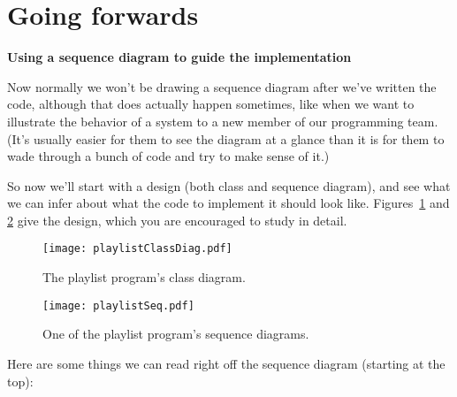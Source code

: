 \section{Going forwards}

\vspace{-.2in}
{\large \textbf{Using a sequence diagram to guide the implementation}}

Now normally we won't be drawing a sequence diagram after we've written the
code, although that does actually happen sometimes, like when we want to
illustrate the behavior of a system to a new member of our programming team.
(It's usually easier for them to see the diagram at a glance than it is for
them to wade through a bunch of code and try to make sense of it.)

So now we'll start with a design (both class and sequence diagram), and see
what we can infer about what the code to implement it should look like.
Figures~\ref{fig:playlistClassDiag} and \ref{fig:playlistSeq} give the
design, which you are encouraged to study in detail.

\begin{figure}
\centering
\texttt{[image: playlistClassDiag.pdf]}
\caption{The playlist program's class diagram.}
\label{fig:playlistClassDiag}

\end{figure}
\begin{figure}
\centering
\hspace*{-1.5in}
\texttt{[image: playlistSeq.pdf]}
\vspace{.1in}
\caption{One of the playlist program's sequence diagrams.
\quad\quad\quad\quad\quad %
\protect\phantom{.}}
\label{fig:playlistSeq}
\end{figure}

Here are some things we can read right off the sequence diagram (starting at
the top):

